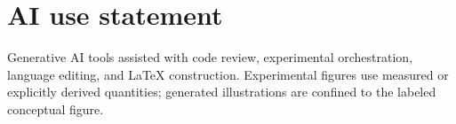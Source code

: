 \documentclass{article}
\begin{document}
\section*{AI use statement}
Generative AI tools assisted with code review, experimental orchestration, language editing, and LaTeX construction. Experimental figures use measured or explicitly derived quantities; generated illustrations are confined to the labeled conceptual figure.

\clearpage
\appendix



\FloatBarrier



\end{document}
